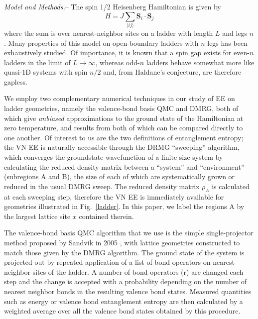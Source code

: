 \documentclass[prl,aps,twocolumn,floatfix,amsmath,amssymb,superscriptaddress,tightenlines]{revtex4}
\begin{document}
{\it Model and Methods.}-- The spin 1/2 Heisenberg Hamiltonian is given by
\begin{equation}
H = J \sum_{\langle i j \rangle} {\mathbf S}_i \cdot {\mathbf S}_j \label{ham}
\end{equation}
where the sum is over nearest-neighbor sites on a ladder with length $L$ and legs $n$.  Many properties of this model on open-boundary ladders with $n$ legs has been exhaustively studied.  Of importance, it is known that a spin gap exists for even-$n$ ladders in the limit of $L\rightarrow \infty$, whereas odd-$n$ ladders behave somewhat more like quasi-1D  systems with spin $n/2$ and, from Haldane's conjecture, are therefore gapless.  

We employ two complementary numerical techniques in our study of EE on ladder geometries, namely the valence-bond basis QMC and DMRG, both of which give {\it unbiased} approximations to the ground state of the Hamiltonian at zero temperature, and results from both of which can be compared directly to one another.  Of interest to us are the two definitions of entanglement entropy; the VN EE is naturally accessible through the DRMG ``sweeping'' algorithm, which converges the groundstate wavefunction of a finite-size system by calculating the reduced density matrix between a ``system'' and ``environment'' (subregions A and B), the size of each of which are systematically grown or reduced in the usual DMRG sweep.  The reduced density matrix $\rho_A$ is calculated at each sweeping step, therefore the VN EE is immediately available for geometries illustrated in Fig.~\ref{ladder}.  In this paper, we label the regions A by the largest lattice site $x$ contained therein.

The valence-bond basis QMC algorithm that we use is the simple single-projector method proposed by Sandvik in 2005 \cite{Sandvik}, with lattice geometries constructed to match those given by the DMRG algorithm.  The ground state of the system is projected out by repeated application of a list of bond operators on nearest neighbor sites of the ladder.  A number of bond operators (r) are changed each step and the change is accepted with a probability depending on the number of nearest neighbor bonds in the resulting valence bond states.  Measured quantities such as energy or valence bond entanglement entropy are then calculated by a weighted average over all the valence bond states obtained by this procedure.
\end{document}
